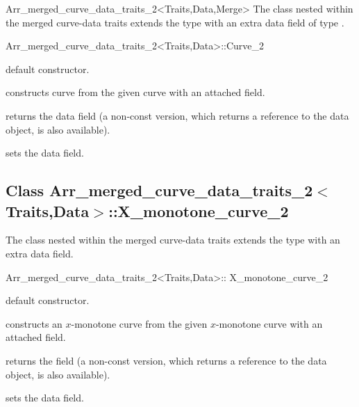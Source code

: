 \begin{ccRefClass}{Arr_merged_curve_data_traits_2<Traits,Data,Merge>}
The  class nested within the merged curve-data traits
extends the  type with an extra data field of type
.

\begin{ccClass}{Arr_merged_curve_data_traits_2<Traits,Data>::Curve_2}

\ccInheritsFrom

\ccCreation
{}

    {default constructor.}

    {constructs curve from the given  curve with an attached
      field.}

\ccAccessFunctions

  {returns the data field (a non-const version, which returns a reference
   to the data object, is also available).}

  {sets the data field.}

\end{ccClass}

\subsection*{Class Arr\_merged\_curve\_data\_traits\_2$<$Traits,Data$>$::X\_monotone\_curve\_2}

The  class nested within the merged 
curve-data traits extends the  type with 
an extra data field.

\begin{ccClass}{Arr_merged_curve_data_traits_2<Traits,Data>::
                X_monotone_curve_2}

\ccInheritsFrom

\ccCreation
{}

    {default constructor.}

    {constructs an $x$-monotone curve from the given  $x$-monotone
     curve with an attached  field.}

\ccAccessFunctions

  {returns the field (a non-const version, which returns a reference
   to the data object, is also available).}

  {sets the data field.}

\end{ccClass}

\end{ccRefClass}

\ccRefPageEnd

